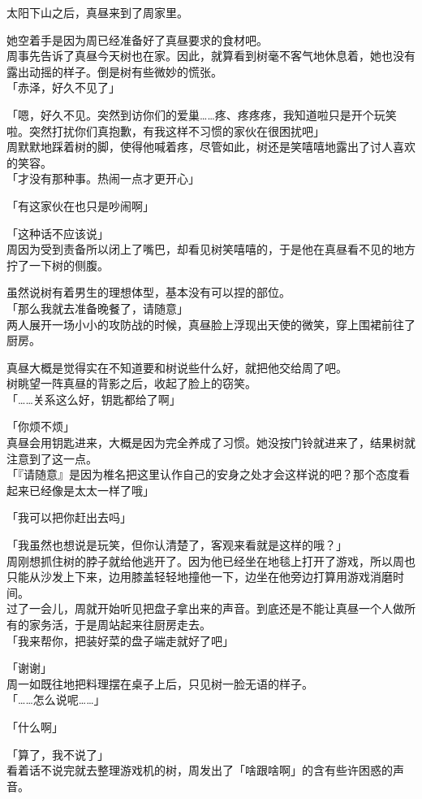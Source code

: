 \vspace{2\baselineskip}

太阳下山之后，真昼来到了周家里。

她空着手是因为周已经准备好了真昼要求的食材吧。\\

周事先告诉了真昼今天树也在家。因此，就算看到树毫不客气地休息着，她也没有露出动摇的样子。倒是树有些微妙的慌张。\\

「赤泽，好久不见了」

「嗯，好久不见。突然到访你们的爱巢……疼、疼疼疼，我知道啦只是开个玩笑啦。突然打扰你们真抱歉，有我这样不习惯的家伙在很困扰吧」\\

周默默地踩着树的脚，使得他喊着疼，尽管如此，树还是笑嘻嘻地露出了讨人喜欢的笑容。\\

「才没有那种事。热闹一点才更开心」

「有这家伙在也只是吵闹啊」

「这种话不应该说」\\

周因为受到责备所以闭上了嘴巴，却看见树笑嘻嘻的，于是他在真昼看不见的地方拧了一下树的侧腹。

虽然说树有着男生的理想体型，基本没有可以捏的部位。\\

「那么我就去准备晚餐了，请随意」\\

两人展开一场小小的攻防战的时候，真昼脸上浮现出天使的微笑，穿上围裙前往了厨房。

真昼大概是觉得实在不知道要和树说些什么好，就把他交给周了吧。\\

树眺望一阵真昼的背影之后，收起了脸上的窃笑。\\

「……关系这么好，钥匙都给了啊」

「你烦不烦」\\

真昼会用钥匙进来，大概是因为完全养成了习惯。她没按门铃就进来了，结果树就注意到了这一点。\\

「『请随意』是因为椎名把这里认作自己的安身之处才会这样说的吧？那个态度看起来已经像是太太一样了哦」

「我可以把你赶出去吗」

「我虽然也想说是玩笑，但你认清楚了，客观来看就是这样的哦？」\\

周刚想抓住树的脖子就给他逃开了。因为他已经坐在地毯上打开了游戏，所以周也只能从沙发上下来，边用膝盖轻轻地撞他一下，边坐在他旁边打算用游戏消磨时间。\\

过了一会儿，周就开始听见把盘子拿出来的声音。到底还是不能让真昼一个人做所有的家务活，于是周站起来往厨房走去。\\

「我来帮你，把装好菜的盘子端走就好了吧」

「谢谢」\\

周一如既往地把料理摆在桌子上后，只见树一脸无语的样子。\\

「……怎么说呢……」

「什么啊」

「算了，我不说了」\\

看着话不说完就去整理游戏机的树，周发出了「啥跟啥啊」的含有些许困惑的声音。
